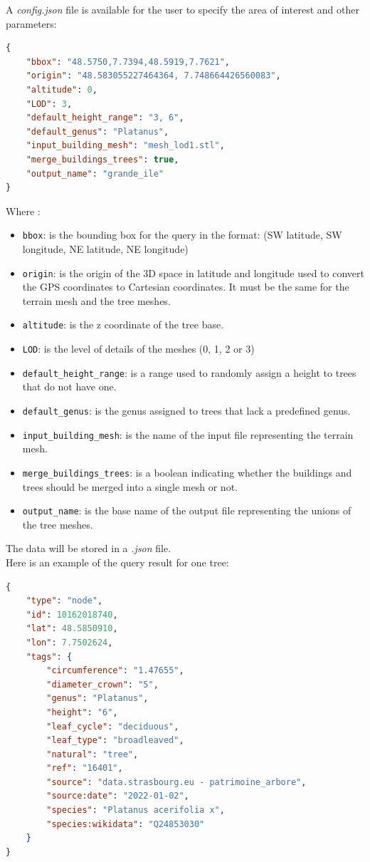 \documentclass[12pt]{article}
\begin{document}
A \textit{config.json} file is available for the user to specify the area of
interest and other parameters:

\begin{lstlisting}[language=json]
{
    "bbox": "48.5750,7.7394,48.5919,7.7621",
    "origin": "48.583055227464364, 7.748664426560083",
    "altitude": 0,
    "LOD": 3,
    "default_height_range": "3, 6",
    "default_genus": "Platanus",
    "input_building_mesh": "mesh_lod1.stl",
    "merge_buildings_trees": true,
    "output_name": "grande_ile"
}
\end{lstlisting}

Where :
\begin{itemize}
    \item \texttt{bbox}: is the bounding box for the query in the format:
    \subitem (SW latitude, SW longitude, NE latitude, NE longitude)
    \item \texttt{origin}: is the origin of the 3D space in latitude and longitude
    used to convert the GPS coordinates to Cartesian coordinates. It must be the
    same for the terrain mesh and the tree meshes.
    \item \texttt{altitude}: is the z coordinate of the tree base.
    \item \texttt{LOD}: is the level of details of the meshes (0, 1, 2 or 3)
    \item \texttt{default\_height\_range}: is a range used to randomly assign a
    height to trees that do not have one.
    \item \texttt{default\_genus}: is the genus assigned to trees that lack a
    predefined genus.
    \item \texttt{input\_building\_mesh}: is the name of the input file
    representing the terrain mesh.
    \item \texttt{merge\_buildings\_trees}: is a boolean indicating whether the
    buildings and trees should be merged into a single mesh or not.
    \item \texttt{output\_name}: is the base name of the output file
    representing the unions of the tree meshes.
\end{itemize}

The data will be stored in a \textit{.json} file. \\
Here is an example of the query result for one tree:

\begin{lstlisting}[language=json]
{
    "type": "node",
    "id": 10162018740,
    "lat": 48.5850910,
    "lon": 7.7502624,
    "tags": {
        "circumference": "1.47655",
        "diameter_crown": "5",
        "genus": "Platanus",
        "height": "6",
        "leaf_cycle": "deciduous",
        "leaf_type": "broadleaved",
        "natural": "tree",
        "ref": "16401",
        "source": "data.strasbourg.eu - patrimoine_arbore",
        "source:date": "2022-01-02",
        "species": "Platanus acerifolia x",
        "species:wikidata": "Q24853030"
    }
}
\end{lstlisting}
\end{document}
